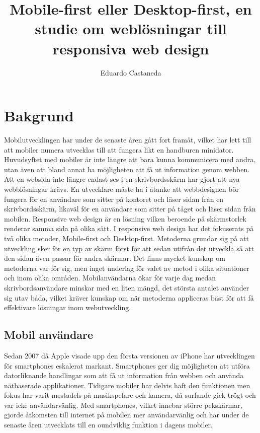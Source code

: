 \documentclass[11pt]{article}
\title{Mobile-first eller Desktop-first, en studie om weblösningar till responsiva web design}
\author{Eduardo Castaneda}
\begin{document}
\maketitle                  %

\newpage

\tableofcontents
\newpage



\section{Bakgrund}

Mobilutvecklingen har under de senaste åren gått fort framåt, vilket har lett till att mobiler numera utvecklas till att fungera likt en handburen minidator. Huvudsyftet med mobiler är inte längre att bara kunna kommunicera med andra, utan även att bland annat ha möjligheten att få ut information genom webben. Att en websida inte längre endast ses i en skrivbordsskärm har gjort att nya webblösningar krävs. En utvecklare måste ha i åtanke att webbdesignen bör fungera för en användare som sitter på kontoret och läser sidan från en skrivbordsskärm, likaväl för en användare som sitter på tåget och läser sidan från mobilen. Responsive web design är en lösning vilken beroende på skärmstorlek renderar samma sida på olika sätt. I responsive web design har det fokuserats på två olika metoder, Mobile-first och Desktop-first. Metoderna grundar sig på att utveckling sker för en typ av skärm först för att sedan utifrån det utveckla så att den sidan även passar för andra skärmar. Det finns mycket kunskap om metoderna var för sig, men inget underlag för valet av metod i olika situationer och inom olika områden. Mobilanvändarna ökar för varje dag medan skrivbordsanvändare minskar med en liten mängd, det största antalet använder sig utav båda, vilket kräver kunskap om när metoderna appliceras bäst för att få effektivare lösningar inom webutveckling.

\subsection{Mobil användare}

Sedan 2007 då Apple visade upp den första versionen av iPhone har utvecklingen för smartphones eskalerat markant. Smartphones ger dig möjligheten att utföra datorliknande handlingar som att få ut information från webben och använda nätbaserade applikationer. Tidigare mobiler har delvis haft den funktionen men fokus har varit mestadels på musikspelare och kamera, då surfande gick trögt och var icke användarvänlig.
Med smartphones, vilket innebar större pekskärmar, gjorde åtkomsten till internet på mobilen mer användarvänlig och har under de senaste åren utvecklats till en oundviklig funktion i dagens mobiler.
\end{document}
